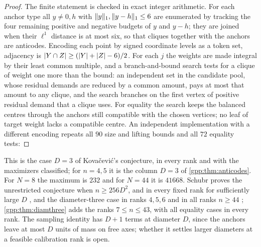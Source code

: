 \begin{proof}
The finite statement is checked in exact integer arithmetic. For each anchor type all
$y\ne0,h$ with $\lVert y\rVert_1,\lVert y-h\rVert_1\le6$ are enumerated by tracking the four remaining
positive and negative budgets of $y$ and $y-h$; they are joined when their $\ell^1$
distance is at most six, so that cliques together with the anchors are anticodes. Encoding
each point by signed coordinate levels as a token set, adjacency is
$\lvert Y\cap Z\rvert\ge(\lvert Y\rvert+\lvert Z\rvert-6)/2$. For each $j$ the weights are made integral by their
least common multiple, and a branch-and-bound search tests for a clique of weight one more
than the bound: an independent set in the candidate pool, whose residual demands are reduced
by a common amount, pays at most that amount to any clique, and the search branches on the
first vertex of positive residual demand that a clique uses. For equality the search keeps
the balanced centres through the anchors still compatible with the chosen vertices; no
leaf of target weight lacks a compatible centre. An independent implementation with a
different encoding repeats all $90$ size and lifting bounds and all $72$ equality tests:
\end{proof}

This is the case $D=3$ of Kova\v{c}evi\'c's conjecture, in every rank and with the
maximizers classified; for $n=4,5$ it is the column $D=3$ of \cref{gpp:thm:anticodes}. For
$N=8$ the maximum is $232$ and for $N=44$ it is $41668$. Schubr proves the unrestricted
conjecture when $n\ge256D^2$, and in every fixed rank for sufficiently large $D$
\cite[Theorems~3.2--3.4]{Schubr2026Maximum}, and the diameter-three case in ranks $4,5,6$ and in
all ranks $n\ge44$ \cite[Theorem~3.6]{Schubr2026Maximum}; \cref{gpp:thm:diamthree} adds the ranks
$7\le n\le43$, with all equality cases in every rank. The sampling identity has $D+1$ terms at
diameter $D$, since the anchors leave at most $D$ units of mass on free axes; whether it
settles larger diameters at a feasible calibration rank is open.


